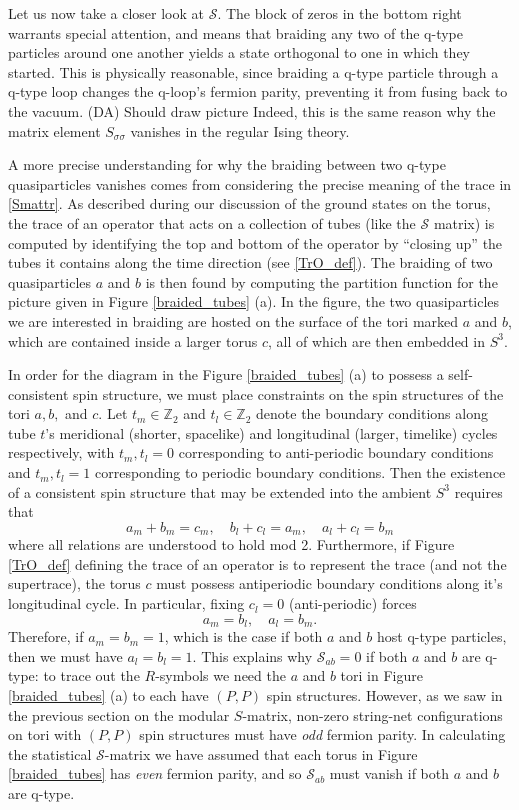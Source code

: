 \documentclass[12pt,a4paper]{article}
\newcommand{\zz}{\mathbb{Z}}
\newcommand{\mcs}{\mathcal{S}}
\newcommand\be            {\begin{equation}}
\newcommand\ee            {\end{equation}}
\newcommand{\dave}[1]{{\color{ao(english)}\footnotesize{(DA) #1}}}
\begin{document}
Let us now take a closer look at $\mcs$. 
The block of zeros in the bottom right warrants special attention, and means that braiding any two of the q-type particles around one another yields a state orthogonal to one in which they started. 
This is physically reasonable, since braiding a q-type particle through a q-type loop changes the q-loop's fermion parity, preventing it from fusing back to the vacuum. 
\dave{Should draw picture}
Indeed, this is the same reason why the matrix element $S_{\sigma\sigma}$ vanishes in the regular Ising theory. 

A more precise understanding for why the braiding between two q-type quasiparticles vanishes comes from considering the precise meaning of the trace in \eqref{Smattr}.
As described during our discussion of the ground states on the torus, the trace of an operator that acts on a collection of tubes (like the $\mcs$ matrix) is computed by identifying the top and bottom of the operator by ``closing up'' the tubes it contains along the time direction (see \eqref{TrO_def}).
The braiding of two quasiparticles $a$ and $b$ is then found by computing the partition function for the picture given in Figure \ref{braided_tubes} (a). 
In the figure, the two quasiparticles we are interested in braiding are hosted on the surface of the tori marked $a$ and $b$, which are contained inside a larger torus $c$, all of which are then embedded in $S^3$. 

In order for the diagram in the Figure \ref{braided_tubes} (a) to possess a self-consistent spin structure, we must place constraints on the spin structures of the tori $a,b,$ and $c$.
Let $t_m\in\zz_2$ and $t_l\in\zz_2$ denote the boundary conditions along tube $t$'s meridional (shorter, spacelike) and longitudinal (larger, timelike) cycles respectively, with $t_m,t_l=0$ corresponding to anti-periodic boundary conditions and $t_m,t_l=1$ corresponding to periodic boundary conditions.  
Then the existence of a consistent spin structure that may be extended into the ambient $S^3$ requires that 
\be a_m+b_m=c_m,\quad b_l+c_l=a_m,\quad a_l+c_l=b_m\ee
where all relations are understood to hold mod 2. 
Furthermore, if Figure \ref{TrO_def} defining the trace of an operator is to represent the trace (and not the supertrace), the torus $c$ must possess antiperiodic boundary conditions along it's longitudinal cycle. 
In particular, fixing $c_l=0$ (anti-periodic) forces 
\be a_m = b_l,\quad a_l=b_m.\ee
Therefore, if $a_m = b_m = 1$, which is the case if both $a$ and $b$ host q-type particles, then we must have $a_l = b_l = 1$. 
This explains why $\mcs_{ab}=0$ if both $a$ and $b$ are q-type: to trace out the $R$-symbols we need the $a$ and $b$ tori in Figure \ref{braided_tubes} (a) to each have $(P,P)$ spin structures. 
However, as we saw in the previous section on the modular $S$-matrix, non-zero string-net configurations on tori with $(P,P)$ spin structures must have {\it odd} fermion parity.
In calculating the statistical $\mcs$-matrix we have assumed that each torus in Figure \ref{braided_tubes} has {\it even} fermion parity, and so $\mcs_{ab}$ must vanish if both $a$ and $b$ are q-type. 
\end{document}
